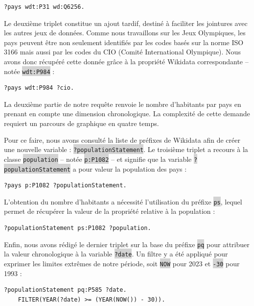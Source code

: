 \documentclass[hidelinks, 12pt]{report}
\newcommand{\code}[1]{\colorbox{LightGray}{\texttt{#1}}}
\begin{document}
\begin{lstlisting}[language=SPARQL]
	?pays wdt:P31 wd:Q6256.
\end{lstlisting}

Le deuxième triplet constitue un ajout tardif, destiné à faciliter les jointures avec les autres jeux de données. Comme nous travaillons sur les Jeux Olympiques, les pays peuvent être non seulement identifiés par les codes basés sur la norme ISO 3166 mais aussi par les codes du CIO (Comité International Olympique). Nous avons donc récupéré cette donnée grâce à la propriété Wikidata correspondante -- notée \code{wdt:P984} :

\begin{lstlisting}[language=SPARQL]
	?pays wdt:P984 ?cio.
\end{lstlisting}

La deuxième partie de notre requête renvoie le nombre d'habitants par pays en prenant en compte une dimension chronologique. La complexité de cette demande requiert un parcours de graphique en quatre temps.

Pour ce faire, nous avons consulté la liste de préfixes\autocite{wikiprefixes} de Wikidata afin de créer une nouvelle variable : \code{?populationStatement}. Le troisième triplet a recours à la classe \code{population} -- notée \code{p:P1082} -- et signifie que la variable \code{?populationStatement} a pour valeur la population des pays :

\begin{lstlisting}[language=SPARQL]
	?pays p:P1082 ?populationStatement.
\end{lstlisting}

L'obtention du nombre d'habitants a nécessité l'utilisation du préfixe \code{ps}, lequel permet de récupérer la valeur de la propriété relative à la population :

\begin{lstlisting}[language=SPARQL]
	?populationStatement ps:P1082 ?population.
\end{lstlisting}

Enfin, nous avons rédigé le dernier triplet sur la base du préfixe \code{pq} pour attribuer la valeur chronologique à la variable \code{?date}. Un filtre y a été appliqué pour exprimer les limites extrêmes de notre période, soit \code{NOW} pour 2023 et \code{-30} pour 1993 :

\begin{lstlisting}[language=SPARQL]
	?populationStatement pq:P585 ?date.
	FILTER(YEAR(?date) >= (YEAR(NOW()) - 30)).
\end{lstlisting}
\end{document}
